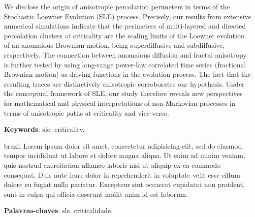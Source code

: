 \setlength{\absparsep}{18pt} %
\begin{resumo}
    We disclose the origin of anisotropic percolation perimeters in terms of
    the Stochastic Loewner Evolution (SLE) process. Precisely, our results from
    extensive numerical simulations indicate that the perimeters of
    multi-layered and directed percolation clusters at criticality are the
    scaling limits of the Loewner evolution of an anomalous Brownian motion,
    being superdiffusive and subdiffusive, respectively. The connection between
    anomalous diffusion and fractal anisotropy is further tested by using
    long-range power-law correlated time series (fractional Brownian motion) as
    driving functions in the evolution process. The fact that the resulting
    traces are distinctively anisotropic corroborates our hypothesis. Under the
    conceptual framework of SLE, our study therefore reveals new perspectives
    for mathematical and physical interpretations of non-Markovian processes in
    terms of anisotropic paths at criticality and vice-versa.
    \vspace{\onelineskip}
    \noindent 

    \textbf{Keywords}: sle\@. criticality.
\end{resumo}

\begin{resumo}[Resumo]
\begin{otherlanguage*}{brazil}
    Lorem ipsum dolor sit amet, consectetur adipisicing elit, sed do eiusmod
    tempor incididunt ut labore et dolore magna aliqua. Ut enim ad minim
    veniam, quis nostrud exercitation ullamco laboris nisi ut aliquip ex ea
    commodo consequat. Duis aute irure dolor in reprehenderit in voluptate
    velit esse cillum dolore eu fugiat nulla pariatur. Excepteur sint occaecat
    cupidatat non proident, sunt in culpa qui officia deserunt mollit anim id
    est laborum.
    \vspace{\onelineskip}
    \noindent 

    \textbf{Palavras-chaves}: sle\@. criticalidade.
\end{otherlanguage*}
\end{resumo}
